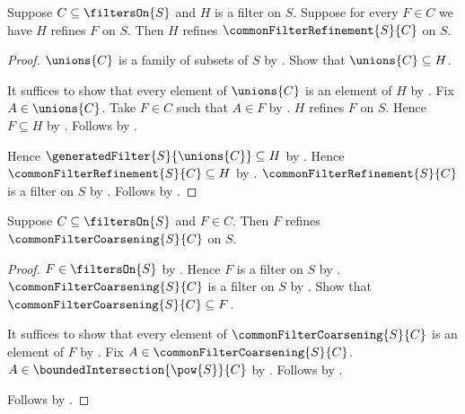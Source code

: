 \begin{theorem}\label{common_filter_refinement_least}
    Suppose $C\subseteq\filtersOn{S}$ and $H$ is a filter on $S$.
    Suppose for every $F\in C$ we have $H$ refines $F$ on $S$.
    Then $H$ refines $\commonFilterRefinement{S}{C}$ on $S$.
\end{theorem}
\begin{proof}
    $\unions{C}$ is a family of subsets of $S$ by
        .
    Show that $\unions{C}\subseteq H$.
    \begin{subproof}
        It suffices to show that every element of $\unions{C}$ is an
            element of $H$ by .
        Fix $A\in\unions{C}$.
        Take $F\in C$ such that $A\in F$ by .
        $H$ refines $F$ on $S$.
        Hence $F\subseteq H$ by .
        Follows by .
    \end{subproof}
    Hence $\generatedFilter{S}{\unions{C}}\subseteq H$ by
        .
    Hence $\commonFilterRefinement{S}{C}\subseteq H$ by
        .
    $\commonFilterRefinement{S}{C}$ is a filter on $S$ by
        .
    Follows by .
\end{proof}

\begin{theorem}\label{members_refine_common_filter_coarsening}
    Suppose $C\subseteq\filtersOn{S}$ and $F\in C$.
    Then $F$ refines $\commonFilterCoarsening{S}{C}$ on $S$.
\end{theorem}
\begin{proof}
    $F\in\filtersOn{S}$ by .
    Hence $F$ is a filter on $S$ by .
    $\commonFilterCoarsening{S}{C}$ is a filter on $S$ by
        .
    Show that $\commonFilterCoarsening{S}{C}\subseteq F$.
    \begin{subproof}
        It suffices to show that every element of
            $\commonFilterCoarsening{S}{C}$ is an element of $F$ by
            .
        Fix $A\in\commonFilterCoarsening{S}{C}$.
        $A\in\boundedIntersection{\pow{S}}{C}$ by
            .
        Follows by .
    \end{subproof}
    Follows by .
\end{proof}


